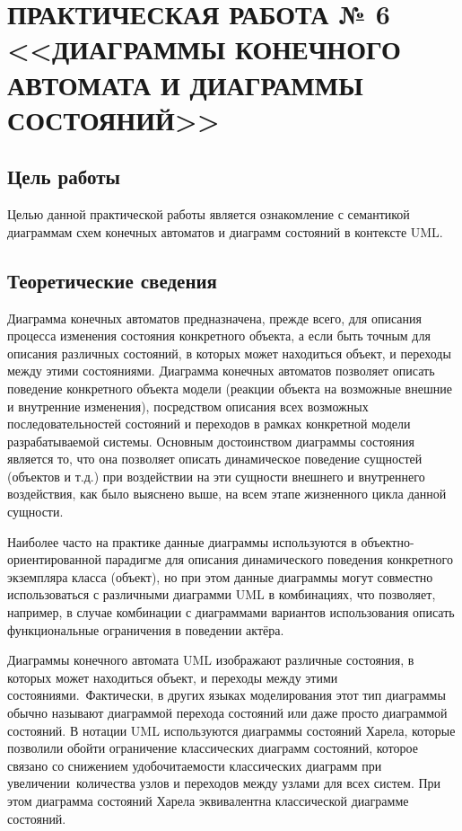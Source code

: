 \chapter{ПРАКТИЧЕСКАЯ РАБОТА № 6 <<ДИАГРАММЫ КОНЕЧНОГО АВТОМАТА И ДИАГРАММЫ СОСТОЯНИЙ>>}

\section{Цель работы}

Целью данной практической работы является ознакомление с семантикой диаграммам схем конечных автоматов и диаграмм состояний в контексте UML.

\section{Теоретические сведения}

Диаграмма конечных автоматов предназначена, прежде всего, для описания процесса изменения состояния конкретного объекта, а если быть точным для описания различных состояний, в которых может находиться объект, и переходы между этими состояниями. Диаграмма конечных автоматов позволяет описать поведение конкретного объекта модели (реакции объекта на возможные внешние и внутренние изменения), посредством описания всех возможных последовательностей состояний и переходов в рамках конкретной модели разрабатываемой системы. Основным достоинством диаграммы состояния является то, что она позволяет описать динамическое поведение сущностей (объектов и т.д.) при воздействии на эти сущности внешнего и внутреннего воздействия, как было выяснено выше, на всем этапе жизненного цикла данной сущности.

Наиболее часто на практике данные диаграммы используются в объектно-ориентированной парадигме для описания динамического поведения конкретного экземпляра класса (объект), но при этом данные диаграммы могут совместно использоваться с различными диаграмми UML в комбинациях, что позволяет, например, в случае комбинации с диаграммами вариантов использования описать функциональные ограничения в поведении актёра.

Диаграммы конечного автомата UML изображают различные состояния, в которых может находиться объект, и переходы между этими состояниями. Фактически, в других языках моделирования этот тип диаграммы обычно называют диаграммой перехода состояний или даже просто диаграммой состояний. В нотации UML используются диаграммы состояний Харела, которые позволили обойти ограничение классических диаграмм состояний, которое связано со снижением удобочитаемости классических диаграмм при увеличении количества узлов и переходов между узлами для всех систем. При этом диаграмма состояний Харела эквивалентна классической диаграмме состояний. 

